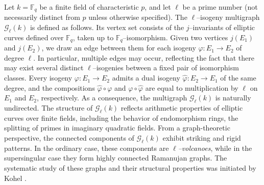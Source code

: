 \documentclass[table]{amsart}
\newcommand{\F}{\mathbb{F}}
\numberwithin{equation}{section}
\begin{document}
Let $k=\F_q$ be a finite field of characteristic $p$, and let $\ell$ be a prime number (not necessarily distinct from $p$ unless otherwise specified). The $\ell$–isogeny multigraph $\mathcal{G}_\ell(k)$ is defined as follows. Its vertex set consists of the $j$–invariants of elliptic curves defined over $\F_q$, taken up to $\F_q$–isomorphism. Given two vertices $j(E_1)$ and $j(E_2)$, we draw an edge between them for each isogeny $\varphi\colon E_1\to E_2$ of degree $\ell$. In particular, multiple edges may occur, reflecting the fact that there may exist several distinct $\ell$–isogenies between a fixed pair of isomorphism classes. Every isogeny $\varphi\colon E_1\to E_2$ admits a dual isogeny $\widehat{\varphi}\colon E_2\to E_1$ of the same degree, and the compositions $\widehat{\varphi}\circ\varphi$ and $\varphi\circ\widehat{\varphi}$ are equal to multiplication by $\ell$ on $E_1$ and $E_2$, respectively. As a consequence, the multigraph $\mathcal{G}_\ell(k)$ is naturally undirected. The structure of $\mathcal{G}_\ell(k)$ reflects arithmetic properties of elliptic curves over finite fields, including the behavior of endomorphism rings, the splitting of primes in imaginary quadratic fields. From a graph-theoretic perspective, the connected components of $\mathcal{G}_\ell(k)$ exhibit striking and rigid patterns. In the ordinary case, these components are \emph{$\ell$–volcanoes}, while in the supersingular case they form highly connected Ramanujan graphs. The systematic study of these graphs and their structural properties was initiated by Kohel \cite{kohel}.
\end{document}
